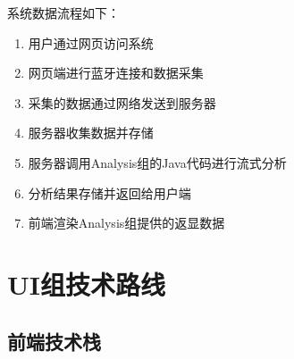 \documentclass[a4paper,12pt]{article}
\begin{document}
系统数据流程如下：
\begin{enumerate}
  \item 用户通过网页访问系统
  \item 网页端进行蓝牙连接和数据采集
  \item 采集的数据通过网络发送到服务器
  \item 服务器收集数据并存储
  \item 服务器调用Analysis组的Java代码进行流式分析
  \item 分析结果存储并返回给用户端
  \item 前端渲染Analysis组提供的返显数据
\end{enumerate}

\section{UI组技术路线}

\subsection{前端技术栈}
\end{document}
